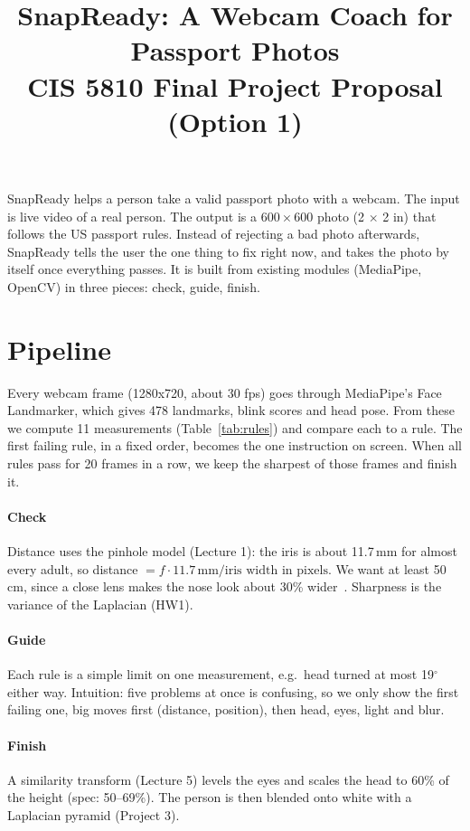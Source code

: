 \documentclass[11pt]{article}
\title{SnapReady: A Webcam Coach for Passport Photos\\[0.2em] \large CIS 5810 Final Project Proposal (Option 1)}
\date{}
\begin{document}
\maketitle
\vspace{-2.5em}

SnapReady helps a person take a valid passport photo with a webcam. The input is live video of a real person. The output is a $600 \times 600$ photo (2 $\times$ 2 in) that follows the US passport rules. Instead of rejecting a bad photo afterwards, SnapReady tells the user the one thing to fix right now, and takes the photo by itself once everything passes. It is built from existing modules (MediaPipe, OpenCV) in three pieces: check, guide, finish.

\section{Pipeline}

Every webcam frame (1280x720, about 30 fps) goes through MediaPipe's Face Landmarker, which gives 478 landmarks, blink scores and head pose. From these we compute 11 measurements (Table~\ref{tab:rules}) and compare each to a rule. The first failing rule, in a fixed order, becomes the one instruction on screen. When all rules pass for 20 frames in a row, we keep the sharpest of those frames and finish it.

\paragraph{Check} Distance uses the pinhole model (Lecture 1): the iris is about 11.7\,mm for almost every adult, so distance $= f \cdot 11.7\,\text{mm} / \text{iris width in pixels}$. We want at least 50\,cm, since a close lens makes the nose look about 30\% wider~\cite{ward2018}. Sharpness is the variance of the Laplacian (HW1).

\paragraph{Guide} Each rule is a simple limit on one measurement, e.g.\ head turned at most 19$^\circ$ either way. Intuition: five problems at once is confusing, so we only show the first failing one, big moves first (distance, position), then head, eyes, light and blur.

\paragraph{Finish} A similarity transform (Lecture 5) levels the eyes and scales the head to 60\% of the height (spec: 50--69\%). The person is then blended onto white with a Laplacian pyramid (Project 3).
\end{document}
